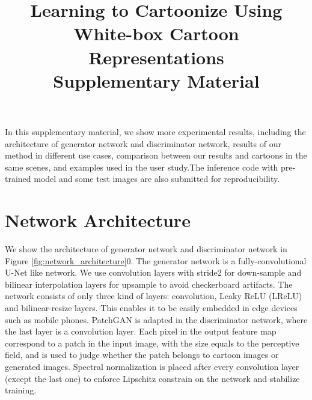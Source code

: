 \documentclass[10pt,twocolumn,letterpaper]{article}
\begin{document}



\title{Learning to Cartoonize Using White-box Cartoon Representations\\Supplementary Material}



In this supplementary material, we show more experimental results, including the architecture of generator network and discriminator network, results of our method in different use cases, comparison between our results and cartoons in the same scenes, and examples used in the user study.The inference code with pre-trained model and some test images are also submitted for reproducibility. 

\vspace{-0.3em}
\section{Network Architecture}
\vspace{-0.3em}
We show the architecture of generator network and discriminator network in Figure \ref{fig:network_architecture}0. The generator network is a fully-convolutional U-Net \cite{ronneberger2015u} like network. We use convolution layers with stride2 for down-sample and bilinear interpolation layers for upsample to avoid checkerboard artifacts. The network consists of only three kind of layers: convolution,  Leaky ReLU (LReLU) \cite{maas2013rectifier} and bilinear-resize layers. This enables it to be easily embedded in edge devices such as mobile phones. PatchGAN \cite{isola2017image} is adapted in the discriminator network, where the last layer is a convolution layer. Each pixel in the output feature map correspond to a patch in the input image, with the size equals to the perceptive field, and is used to judge whether the patch belongs to cartoon images or generated images. Spectral normalization \cite{miyato2018spectral} is placed after every convolution layer (except the last one) to enforce Lipschitz constrain on the network and stabilize training. 
\end{document}
